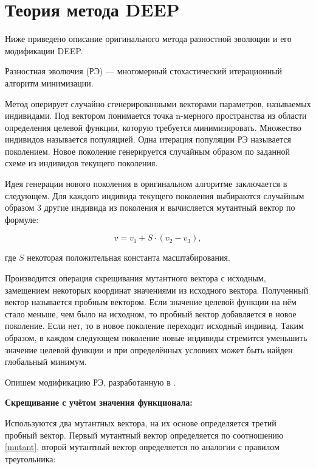 \section*{Теория метода DEEP}

Ниже приведено описание оригинального метода разностной эволюции
и его модификации DEEP.

Разностная эволючия (РЭ) ---
многомерный стохастический итерационный алгоритм минимизации.

Метод оперирует случайно сгенерированными векторами параметров,
называемых индивидами. 
Под вектором понимается точка n-мерного пространства
из области определения целевой функции,
которую требуется минимизировать.
Множество индивидов называется популяцией.
Одна итерация популяции РЭ называется поколением.
Новое поколение генерируется случайным образом
по заданной схеме из индивидов текущего поколения.

Идея генерации нового поколения в оригинальном алгоритме
заключается в следующем.
Для каждого индивида текущего поколения
выбираются случайным образом 3 другие индивида
из поколения и вычисляется мутантный вектор по формуле:

\begin{equation} \label{mutant}
    v = v_1 + S \cdot (v_2 - v_3),
\end{equation}

где \begin{math}S\end{math} некоторая положительная константа масштабирования.

Производится операция скрещивания мутантного вектора с исходным,
замещением некоторых координат значениями из исходного вектора.
Полученный вектор называется пробным вектором.
Если значение целевой функции на нём стало меньше,
чем было на исходном, то пробный вектор добавляется в новое поколение.
Если нет, то в новое поколение переходит исходный индивид.
Таким образом, в каждом следующем поколение новые индивиды
стремится уменьшить значение целевой функции
и при определённых условиях может быть найден глобальный минимум.

Опишем модификацию РЭ, разработанную в \cite{KozlovThesis}.

\textbf{Скрещивание с учётом значения функционала:}

Используются два мутантных вектора,
на их основе определяется третий пробный вектор.
Первый мутантный вектор определяется по соотношению \ref{mutant},
второй мутантный вектор определяется по аналогии с правилом треугольника:

